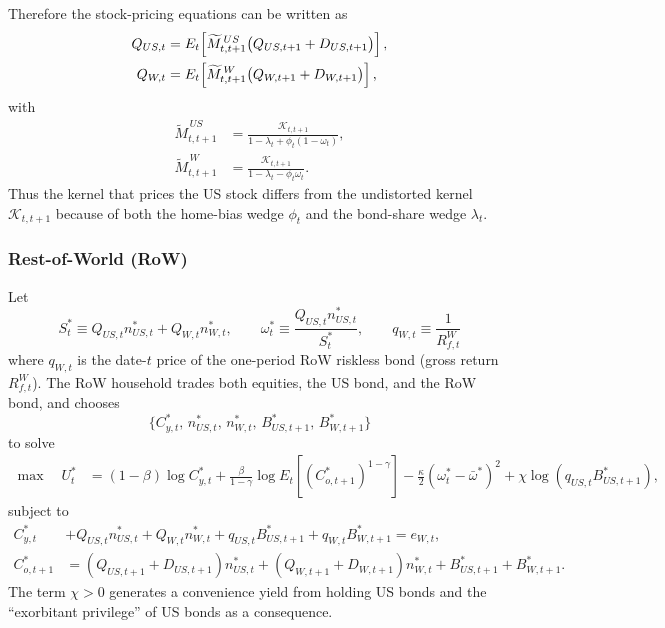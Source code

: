\documentclass[12pt]{article}
\theoremstyle{plain}
\begin{document}
Therefore the stock-pricing equations can be written as
\begin{align}
Q_{US,t}
&=
E_t\!\left[\widetilde M^{\,US}_{t,t+1}\bigl(Q_{US,t+1}+D_{US,t+1}\bigr)\right],\label{US_AP_bond_cost}\\
Q_{W,t}
&=
E_t\!\left[\widetilde M^{\,W}_{t,t+1}\bigl(Q_{W,t+1}+D_{W,t+1}\bigr)\right],\notag
\end{align}
with
\begin{align*}
\widetilde M^{\,US}_{t,t+1}
&=
\frac{\mathcal K_{t,t+1}}
{1-\lambda_t+\phi_t(1-\omega_t)},\\
\widetilde M^{\,W}_{t,t+1}
&=
\frac{\mathcal K_{t,t+1}}
{1-\lambda_t-\phi_t\omega_t}.
\end{align*}
Thus the kernel that prices the US stock differs from the undistorted kernel $\mathcal K_{t,t+1}$ because of
both the home-bias wedge $\phi_t$ and the bond-share wedge $\lambda_t$.

\subsubsection{Rest-of-World (RoW)}

Let
\[
S_t^* \equiv Q_{US,t}n^*_{US,t}+Q_{W,t}n^*_{W,t},
\qquad
\omega_t^* \equiv \frac{Q_{US,t}n^*_{US,t}}{S_t^*},
\qquad
q_{W,t}\equiv \frac{1}{R_{f,t}^W}
\]
where $q_{W,t}$ is the date-$t$ price of the one-period RoW riskless bond (gross return $R_{f,t}^W$).
The RoW household trades both equities, the US bond, and the RoW bond, and chooses
\[
\{C^*_{y,t},\,n^*_{US,t},\,n^*_{W,t},\,B^*_{US,t+1},\,B^*_{W,t+1}\}
\]
to solve
\begin{align*}
\max\quad U_t^*
&=
(1-\beta)\log C^*_{y,t}
+\frac{\beta}{1-\gamma}\log E_t\!\left[\left(C^*_{o,t+1}\right)^{1-\gamma}\right]
-\frac{\kappa}{2}\left(\omega_t^*-\bar\omega^*\right)^2
+\chi\log\!\left(q_{US,t}B^*_{US,t+1}\right),
\end{align*}
subject to
\begin{align*}
C^*_{y,t}
&+Q_{US,t}n^*_{US,t}+Q_{W,t}n^*_{W,t}
+q_{US,t}B^*_{US,t+1}+q_{W,t}B^*_{W,t+1}
= e_{W,t},\\
C^*_{o,t+1}
&=
(Q_{US,t+1}+D_{US,t+1})n^*_{US,t}
+(Q_{W,t+1}+D_{W,t+1})n^*_{W,t}
+B^*_{US,t+1}+B^*_{W,t+1}.
\end{align*}
The term $\chi>0$ generates a convenience yield from holding US bonds and the ``exorbitant privilege'' of US bonds as a consequence.
\end{document}
